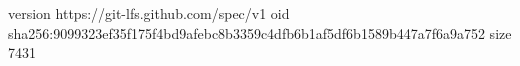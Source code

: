 version https://git-lfs.github.com/spec/v1
oid sha256:9099323ef35f175f4bd9afebc8b3359c4dfb6b1af5df6b1589b447a7f6a9a752
size 7431
